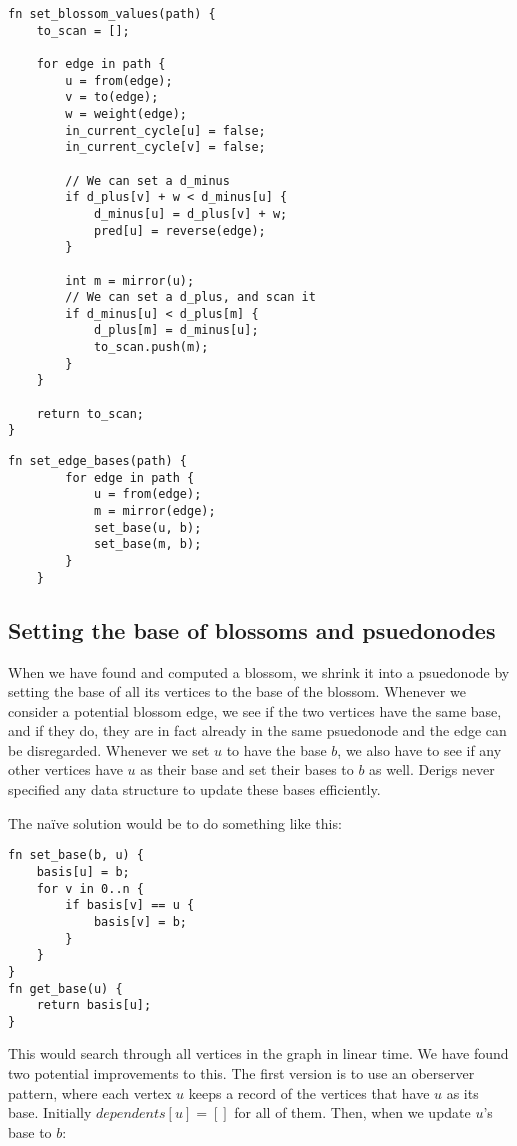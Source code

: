 \begin{lstlisting}[caption={Set blossom values},label=Listing,mathescape=true]
fn set_blossom_values(path) {
    to_scan = [];

    for edge in path {
        u = from(edge);
        v = to(edge);
        w = weight(edge);
        in_current_cycle[u] = false;
        in_current_cycle[v] = false;

        // We can set a d_minus
        if d_plus[v] + w < d_minus[u] {
            d_minus[u] = d_plus[v] + w;
            pred[u] = reverse(edge);
        }

        int m = mirror(u);
        // We can set a d_plus, and scan it
        if d_minus[u] < d_plus[m] {
            d_plus[m] = d_minus[u];
            to_scan.push(m);
        }
    }

    return to_scan;
}
\end{lstlisting}

\begin{lstlisting}[caption={Set edge bases},label=Listing,mathescape=true]
    fn set_edge_bases(path) {
        for edge in path {
            u = from(edge);
            m = mirror(edge);
            set_base(u, b);
            set_base(m, b);
        }
    }
    \end{lstlisting}

\subsection{Setting the base of blossoms and psuedonodes}
\label{basis-code}
When we have found and computed a blossom, we shrink it into a psuedonode by setting the base of all its vertices to the base of the blossom. Whenever we consider a potential blossom edge, we see if the two vertices have the same base, and if they do, they are in fact already in the same psuedonode and the edge can be disregarded. Whenever we set $u$ to have the base $b$, we also have to see if any other vertices have $u$ as their base and set their bases to $b$ as well. Derigs never specified any data structure to update these bases efficiently.

The naïve solution would be to do something like this:
\begin{lstlisting}[caption={Näive basis},label=Listing,mathescape=true]
fn set_base(b, u) {
    basis[u] = b;
    for v in 0..n {
        if basis[v] == u {
            basis[v] = b;
        }
    }
}
fn get_base(u) {
    return basis[u];
}
\end{lstlisting}
This would search through all vertices in the graph in linear time. We have found two potential improvements to this. The first version is to use an oberserver pattern, where each vertex $u$ keeps a record of the vertices that have $u$ as its base. Initially $dependents[u] = []$ for all of them. Then, when we update $u$'s base to $b$:

